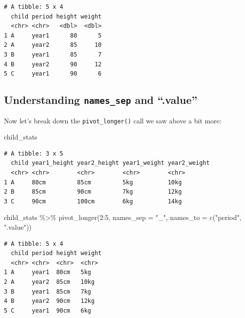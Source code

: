 \documentclass[
  letterpaper,
  DIV=11,
  numbers=noendperiod]{scrreprt}
\newenvironment{Shaded}{\begin{snugshade}}{\end{snugshade}}
\newcommand{\AttributeTok}[1]{\textcolor[rgb]{0.40,0.45,0.13}{#1}}
\newcommand{\DecValTok}[1]{\textcolor[rgb]{0.68,0.00,0.00}{#1}}
\newcommand{\FunctionTok}[1]{\textcolor[rgb]{0.28,0.35,0.67}{#1}}
\newcommand{\NormalTok}[1]{\textcolor[rgb]{0.00,0.23,0.31}{#1}}
\newcommand{\SpecialCharTok}[1]{\textcolor[rgb]{0.37,0.37,0.37}{#1}}
\newcommand{\StringTok}[1]{\textcolor[rgb]{0.13,0.47,0.30}{#1}}
\begin{document}
\begin{tcolorbox}
\begin{verbatim}
# A tibble: 5 x 4
  child period height weight
  <chr> <chr>   <dbl>  <dbl>
1 A     year1      80      5
2 A     year2      85     10
3 B     year1      85      7
4 B     year2      90     12
5 C     year1      90      6
\end{verbatim}

\end{tcolorbox}

\hypertarget{understanding-names_sep-and-.value}{%
\subsection{\texorpdfstring{Understanding \texttt{names\_sep} and
``.value''}{Understanding names\_sep and ``.value''}}\label{understanding-names_sep-and-.value}}

Now let's break down the \texttt{pivot\_longer()} call we saw above a
bit more:

\begin{Shaded}
\begin{Highlighting}[]
\NormalTok{child\_stats}
\end{Highlighting}
\end{Shaded}

\begin{verbatim}
# A tibble: 3 x 5
  child year1_height year2_height year1_weight year2_weight
  <chr> <chr>        <chr>        <chr>        <chr>       
1 A     80cm         85cm         5kg          10kg        
2 B     85cm         90cm         7kg          12kg        
3 C     90cm         100cm        6kg          14kg        
\end{verbatim}

\begin{Shaded}
\begin{Highlighting}[]
\NormalTok{child\_stats }\SpecialCharTok{\%\textgreater{}\%} 
  \FunctionTok{pivot\_longer}\NormalTok{(}\DecValTok{2}\SpecialCharTok{:}\DecValTok{5}\NormalTok{, }
               \AttributeTok{names\_sep =} \StringTok{"\_"}\NormalTok{,}
               \AttributeTok{names\_to =} \FunctionTok{c}\NormalTok{(}\StringTok{"period"}\NormalTok{, }\StringTok{".value"}\NormalTok{))}
\end{Highlighting}
\end{Shaded}

\begin{verbatim}
# A tibble: 5 x 4
  child period height weight
  <chr> <chr>  <chr>  <chr> 
1 A     year1  80cm   5kg   
2 A     year2  85cm   10kg  
3 B     year1  85cm   7kg   
4 B     year2  90cm   12kg  
5 C     year1  90cm   6kg   
\end{verbatim}
\end{document}
